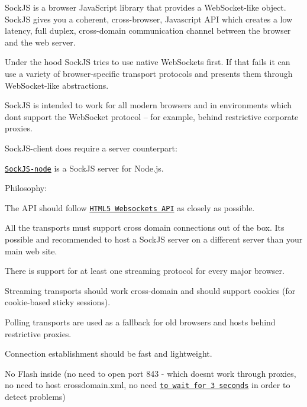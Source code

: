 \href{https://www.npmjs.com/package/sockjs-client}{\tt }\href{https://travis-ci.org/sockjs/sockjs-client}{\tt }\href{https://david-dm.org/sockjs/sockjs-client}{\tt }\href{https://gitter.im/sockjs/sockjs-client}{\tt } \href{https://saucelabs.com/u/brycekahle}{\tt }

Sock\+JS is a browser Java\+Script library that provides a Web\+Socket-\/like object. Sock\+JS gives you a coherent, cross-\/browser, Javascript A\+PI which creates a low latency, full duplex, cross-\/domain communication channel between the browser and the web server.

Under the hood Sock\+JS tries to use native Web\+Sockets first. If that fails it can use a variety of browser-\/specific transport protocols and presents them through Web\+Socket-\/like abstractions.

Sock\+JS is intended to work for all modern browsers and in environments which don\textquotesingle{}t support the Web\+Socket protocol -- for example, behind restrictive corporate proxies.

Sock\+J\+S-\/client does require a server counterpart\+:


\begin{DoxyItemize}
\item \href{https://github.com/sockjs/sockjs-node}{\tt Sock\+J\+S-\/node} is a Sock\+JS server for Node.\+js.
\end{DoxyItemize}

Philosophy\+:


\begin{DoxyItemize}
\item The A\+PI should follow \href{https://www.w3.org/TR/websockets/}{\tt H\+T\+M\+L5 Websockets A\+PI} as closely as possible.
\item All the transports must support cross domain connections out of the box. It\textquotesingle{}s possible and recommended to host a Sock\+JS server on a different server than your main web site.
\item There is support for at least one streaming protocol for every major browser.
\item Streaming transports should work cross-\/domain and should support cookies (for cookie-\/based sticky sessions).
\item Polling transports are used as a fallback for old browsers and hosts behind restrictive proxies.
\item Connection establishment should be fast and lightweight.
\item No Flash inside (no need to open port 843 -\/ which doesn\textquotesingle{}t work through proxies, no need to host \textquotesingle{}crossdomain.\+xml\textquotesingle{}, no need \href{https://github.com/gimite/web-socket-js/issues/49}{\tt to wait for 3 seconds} in order to detect problems)
\end{DoxyItemize}

